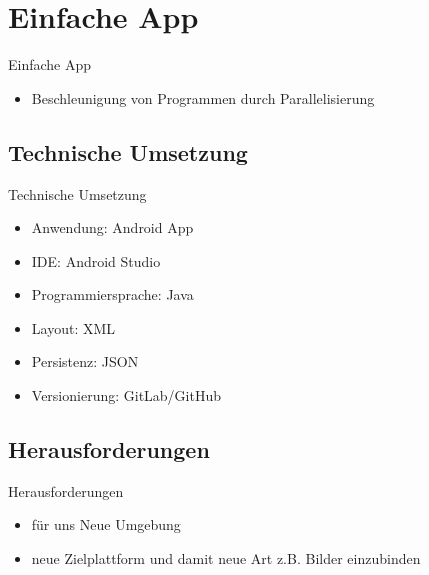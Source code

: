 \documentclass[10pt,fleqn]{beamer}
\begin{document}
\section{Einfache App}
\begin{frame}[t]{Einfache App}
	\begin{itemize}
		\item Beschleunigung von Programmen durch Parallelisierung
	\end{itemize}
\end{frame}

\subsection{Technische Umsetzung}
\begin{frame}[t]{Technische Umsetzung}
	\begin{itemize}
		\item Anwendung: Android App
		\item IDE: Android Studio
		\item Programmiersprache: Java
		\item Layout: XML
		\item Persistenz: JSON
		\item Versionierung: GitLab/GitHub
	\end{itemize}
\end{frame}

\subsection{Herausforderungen}
	\begin{frame}[t]{Herausforderungen}
		\begin{itemize}
			\item für uns Neue Umgebung
			\item neue Zielplattform und damit neue Art z.B. Bilder einzubinden
		\end{itemize}
	\end{frame}
\end{document}
